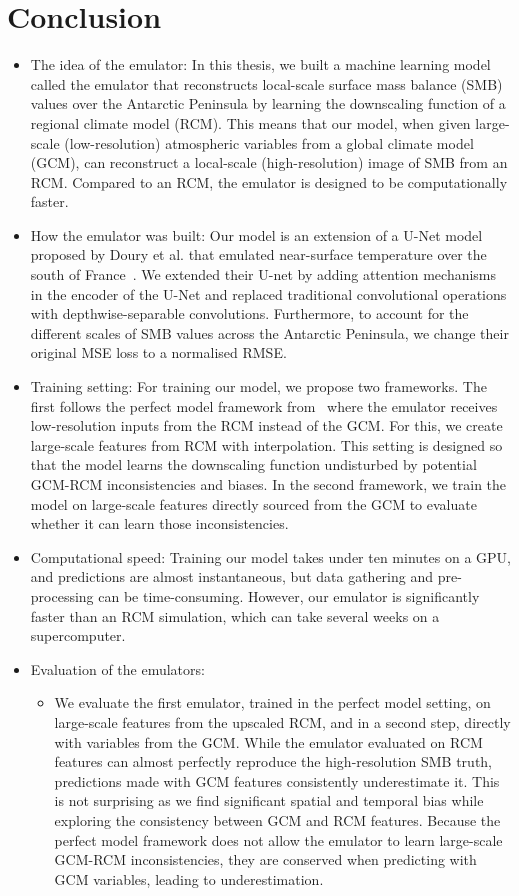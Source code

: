 \documentclass[a4paper,11pt,oneside]{report}
\begin{document}
\chapter{Conclusion}
\begin{itemize}
    \item The idea of the emulator: In this thesis, we built a machine learning model called the emulator that reconstructs local-scale surface mass balance (SMB) values over the Antarctic Peninsula by learning the downscaling function of a regional climate model (RCM). This means that our model, when given large-scale (low-resolution) atmospheric variables from a global climate model (GCM), can reconstruct a local-scale (high-resolution) image of SMB from an RCM. Compared to an RCM, the emulator is designed to be computationally faster.   
    \item How the emulator was built: Our model is an extension of a U-Net model proposed by Doury et al. that emulated near-surface temperature over the south of France~\cite{Doury}. We extended their U-net by adding attention mechanisms in the encoder of the U-Net and replaced traditional convolutional operations with depthwise-separable convolutions. Furthermore, to account for the different scales of SMB values across the Antarctic Peninsula, we change their original MSE loss to a normalised RMSE. 
    \item Training setting: For training our model, we propose two frameworks. The first follows the perfect model framework from~\cite{Doury} where the emulator receives low-resolution inputs from the RCM instead of the GCM. For this, we create large-scale features from RCM with interpolation. This setting is designed so that the model learns the downscaling function undisturbed by potential GCM-RCM inconsistencies and biases. In the second framework, we train the model on large-scale features directly sourced from the GCM to evaluate whether it can learn those inconsistencies. 
    \item Computational speed: Training our model takes under ten minutes on a GPU, and predictions are almost instantaneous, but data gathering and pre-processing can be time-consuming. However, our emulator is significantly faster than an RCM simulation, which can take several weeks on a supercomputer. 
    \item Evaluation of the emulators:
    \begin{itemize}
        \item We evaluate the first emulator, trained in the perfect model setting, on large-scale features from the upscaled RCM, and in a second step, directly with variables from the GCM. While the emulator evaluated on RCM features can almost perfectly reproduce the high-resolution SMB truth, predictions made with GCM features consistently underestimate it. This is not surprising as we find significant spatial and temporal bias while exploring the consistency between GCM and RCM features. Because the perfect model framework does not allow the emulator to learn large-scale GCM-RCM inconsistencies, they are conserved when predicting with GCM variables, leading to underestimation. 

\end{itemize}
\end{itemize}
\end{document}
